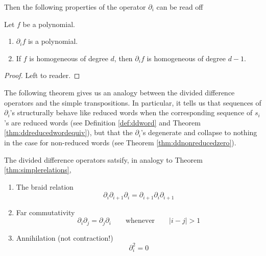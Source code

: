 \documentclass{article}
\begin{document}
Then the following properties of the operator $\partial_i$ can be read off

\begin{corollary} 
    Let $f$ be a polynomial.
    \begin{enumerate}[label=(\alph*)]
        \item $\partial_if$ is a polynomial.
        \item If $f$ is homogeneous of degree $d$, then $\partial_if$ is homogeneous of degree $d-1$.
    \end{enumerate}
\end{corollary}

\begin{proof}
    Left to reader.
\end{proof}

The following theorem gives us an analogy between the divided difference operators and the simple transpositions.
In particular, it tells us that sequences of $\partial_i$'s structurally behave like reduced words when the corresponding sequence of $s_i$'s are reduced words (see Definition \ref{def:ddword} and Theorem \ref{thm:ddreducedwordequiv}), but that the $\partial_i$'s degenerate and collapse to nothing in the case for non-reduced words (see Theorem \ref{thm:ddnonreducedzero}).

\begin{theorem}\label{thm:ddrelations}
    The divided difference operators satsify, in analogy to Theorem \ref{thm:simplerelations},
    \begin{enumerate}[label=(\alph*)]
        \item The braid relation
            \begin{equation}\label{eq:ddbraid}
                \partial_i\partial_{i+1}\partial_i = \partial_{i+1}\partial_i\partial_{i+1}
            \end{equation}
        \item Far commutativity
            \begin{equation}\label{eq:ddcommute}
                \partial_i\partial_j = \partial_j\partial_i\qquad \text{whenever}\qquad|i-j| > 1
            \end{equation}
        \item Annihilation (not contraction!)
            \begin{equation}\label{eq:ddcontract}
                \partial_i^2 = 0
            \end{equation}
    \end{enumerate}
\end{theorem}
\end{document}

